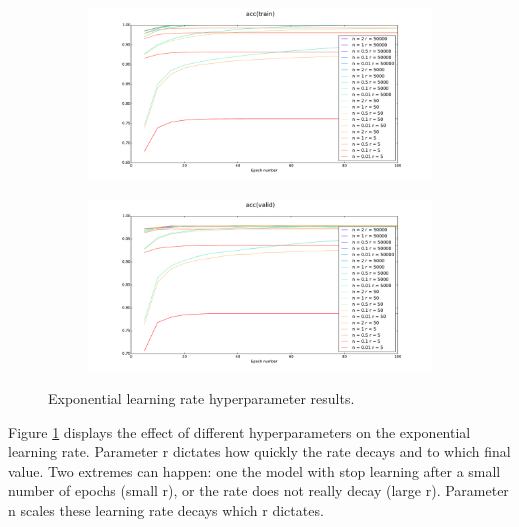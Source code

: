 \documentclass[12pt]{article}
\begin{document}
\begin{figure}[h]
\centering
\begin{subfigure}{.5\textwidth}
  \centering
  \includegraphics[width=9.1cm]{Task1/figures/Exp_rule_acc(train).pdf}
\end{subfigure}%
\begin{subfigure}{.5\textwidth}
  \centering
  \includegraphics[width=9.1cm]{Task1/figures/Exp_rule_acc(valid).pdf}
\end{subfigure}%
  \caption{Exponential learning rate hyperparameter results.}
  \label{fig:exp}
\end{figure}

Figure \ref{fig:exp} displays the effect of different hyperparameters on the exponential learning rate. Parameter r dictates how quickly the rate decays and to which final value. Two extremes can happen: one the model with stop learning after a small number of epochs (small r), or the rate does not really decay (large r). Parameter n scales these learning rate decays which r dictates. 
\end{document}
